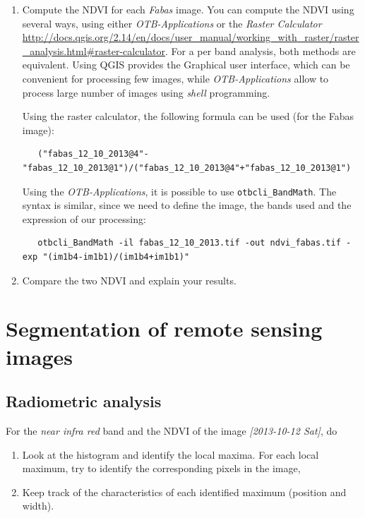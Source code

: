 \documentclass[a4paper,11pt,DIV=18]{scrartcl}
\begin{document}
\begin{work}
\begin{enumerate}
\item Compute  the NDVI for each  \emph{Fabas} image.  You can  compute the NDVI
using several  ways, using  either \emph{OTB-Applications} or  the \emph{Raster
Calculator}
\url{http://docs.qgis.org/2.14/en/docs/user\_manual/working\_with\_raster/raster\_analysis.html\#raster-calculator}.
For a per  band analysis, both methods are  equivalent.  Using QGIS
provides the Graphical user interface,  which can be convenient for
processing  few images,  while  \emph{OTB-Applications}  allow to  process
large number of images using \emph{shell} programming.

Using the raster calculator, the following formula can be used (for
the Fabas image):

\begin{verbatim}
   ("fabas_12_10_2013@4"-"fabas_12_10_2013@1")/("fabas_12_10_2013@4"+"fabas_12_10_2013@1")
\end{verbatim}

Using    the   \emph{OTB-Applications},    it   is    possible   to    use
\texttt{otbcli\_BandMath}. The syntax is similar, since we need to define the
image, the bands used and the expression of our processing:

\begin{verbatim}
   otbcli_BandMath -il fabas_12_10_2013.tif -out ndvi_fabas.tif -exp "(im1b4-im1b1)/(im1b4+im1b1)"
\end{verbatim}

\item Compare the two NDVI and explain your results.
\end{enumerate}
\end{work}
\section{Segmentation of remote sensing images}
\label{sec:org87511f2}
\subsection{Radiometric analysis}
\label{sec:org2f29d65}
\begin{work}
For   the  \emph{near   infra  red}   band  and   the  NDVI   of  the   image
\textit{[2013-10-12 Sat]}, do
\begin{enumerate}
\item Look  at the  histogram and  identify the  local maxima.   For each
local  maximum, try  to identify  the corresponding  pixels in  the
image,
\item Keep track  of  the characteristics  of  each identified  maximum
(position and width).
\end{enumerate}
\end{work}
\end{document}
